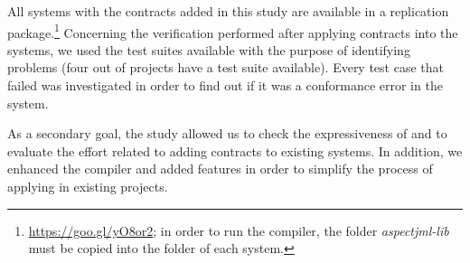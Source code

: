 All systems with the contracts added in this study are available in a replication
package.\footnote{\url{https://goo.gl/yO8or2}; in order to run the
\contractjdoc{} compiler, the folder \textit{aspectjml-lib} must be copied into the folder of each system.}
Concerning the verification performed after applying \contractjdoc{} contracts into the systems,
we used the test suites available with the purpose of identifying problems
(four out of \totalSystems{} projects have a test suite available).
Every test case that failed was investigated in order to find out if it was a conformance error in the system.

As a secondary goal, the study allowed us to check the expressiveness of \contractjdoc{} and to
evaluate the effort related to adding contracts to existing systems.
In addition, we enhanced the compiler and added features in order to simplify
the process of applying \contractjdoc{} in existing projects.

